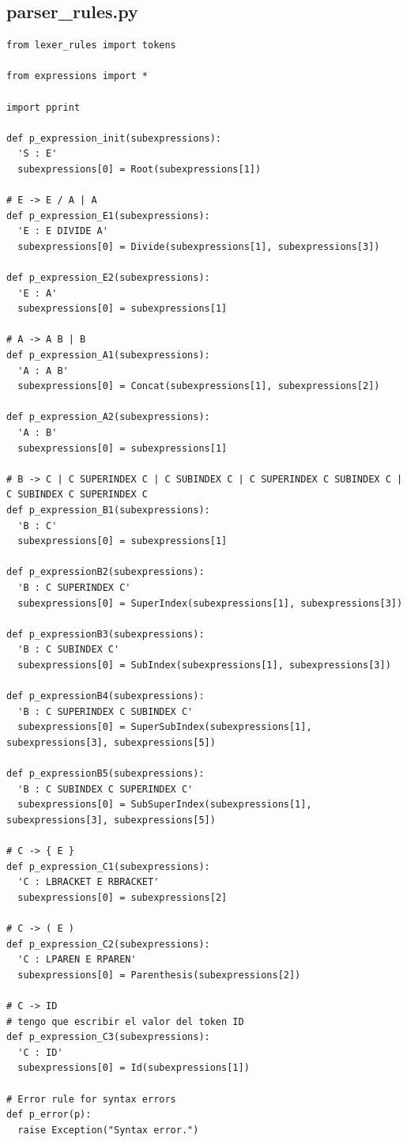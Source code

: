 \documentclass[a4paper, 10pt, twoside]{article}
\begin{document}
\subsection{parser_rules.py}
% 
\begin{lstlisting}
from lexer_rules import tokens

from expressions import *

import pprint

def p_expression_init(subexpressions):
  'S : E'
  subexpressions[0] = Root(subexpressions[1])

# E -> E / A | A
def p_expression_E1(subexpressions):
  'E : E DIVIDE A'
  subexpressions[0] = Divide(subexpressions[1], subexpressions[3])

def p_expression_E2(subexpressions):
  'E : A'
  subexpressions[0] = subexpressions[1]

# A -> A B | B
def p_expression_A1(subexpressions):
  'A : A B'
  subexpressions[0] = Concat(subexpressions[1], subexpressions[2])

def p_expression_A2(subexpressions):
  'A : B'
  subexpressions[0] = subexpressions[1]

# B -> C | C SUPERINDEX C | C SUBINDEX C | C SUPERINDEX C SUBINDEX C | C SUBINDEX C SUPERINDEX C
def p_expression_B1(subexpressions):
  'B : C'
  subexpressions[0] = subexpressions[1]

def p_expressionB2(subexpressions):
  'B : C SUPERINDEX C'
  subexpressions[0] = SuperIndex(subexpressions[1], subexpressions[3])

def p_expressionB3(subexpressions):
  'B : C SUBINDEX C'
  subexpressions[0] = SubIndex(subexpressions[1], subexpressions[3])

def p_expressionB4(subexpressions):
  'B : C SUPERINDEX C SUBINDEX C'
  subexpressions[0] = SuperSubIndex(subexpressions[1], subexpressions[3], subexpressions[5])

def p_expressionB5(subexpressions):
  'B : C SUBINDEX C SUPERINDEX C'
  subexpressions[0] = SubSuperIndex(subexpressions[1], subexpressions[3], subexpressions[5])

# C -> { E }
def p_expression_C1(subexpressions):
  'C : LBRACKET E RBRACKET'
  subexpressions[0] = subexpressions[2]

# C -> ( E )
def p_expression_C2(subexpressions):
  'C : LPAREN E RPAREN'
  subexpressions[0] = Parenthesis(subexpressions[2])

# C -> ID
# tengo que escribir el valor del token ID
def p_expression_C3(subexpressions):
  'C : ID'
  subexpressions[0] = Id(subexpressions[1])

# Error rule for syntax errors
def p_error(p):
  raise Exception("Syntax error.")

\end{lstlisting}
\end{document}
